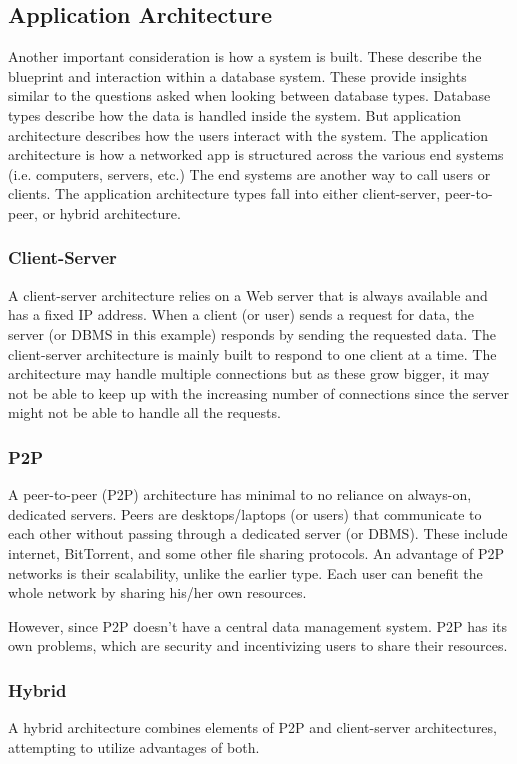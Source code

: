 \documentclass[acmsmall]{acmart}
\begin{document}
\subsection{Application Architecture}
Another important consideration is how a system is built. These describe the blueprint and interaction within a database system. These provide insights similar to the questions asked when looking between database types. Database types describe how the data is handled inside the system. But application architecture describes how the users interact with the system. The application architecture is how a networked app is structured across the various end systems (i.e. computers, servers, etc.) \cite{kurose} The end systems are another way to call users or clients. 
The application architecture types fall into either client-server, peer-to-peer, or hybrid architecture.

\subsubsection{Client-Server}
A client-server architecture relies on a Web server that is always available and has a fixed IP address. When a client (or user) sends a request for data, the server (or DBMS in this example) responds by sending the requested data. The client-server architecture is mainly built to respond to one client at a time. The architecture may handle multiple connections but as these grow bigger, it may not be able to keep up with the increasing number of connections since the server might not be able to handle all the requests.

\subsubsection{P2P}
A peer-to-peer (P2P) architecture has minimal to no reliance on always-on, dedicated servers. Peers are desktops/laptops (or users) that communicate to each other without passing through a dedicated server (or DBMS). These include internet, BitTorrent, and some other file sharing protocols. An advantage of P2P networks is their scalability, unlike the earlier type. Each user can benefit the whole network by sharing his/her own resources. 

However, since P2P doesn't have a central data management system. P2P has its own problems, which are security and incentivizing users to share their resources.

\subsubsection{Hybrid}
A hybrid architecture combines elements of P2P and client-server architectures, attempting to utilize advantages of both.
\end{document}
